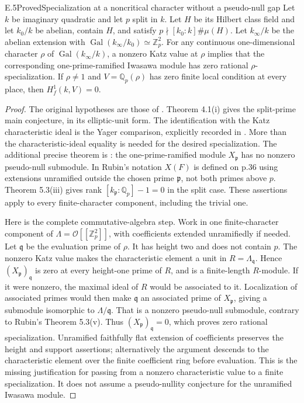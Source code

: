 \begin{statement}{E.5}{Proved}{Specialization at a noncritical character without a pseudo-null gap}
Let \(k\) be imaginary quadratic and let \(p\) split in \(k\).
Let \(H\) be its Hilbert class field and let \(k_0/k\) be
abelian, contain \(H\), and satisfy
\(p\nmid[k_0:k]\#\mu(H)\). Let \(k_\infty/k\) be the
abelian extension with
\(\operatorname{Gal}(k_\infty/k_0)\simeq\mathbb Z_p^2\).
For any continuous one-dimensional character \(\rho\)
of \(\operatorname{Gal}(k_\infty/k)\), a nonzero Katz value
at \(\rho\) implies that the corresponding one-prime-ramified
Iwasawa module has zero rational \(\rho\)-specialization.
If \(\rho\ne1\) and \(V=\mathbb Q_p(\rho)\) has zero
finite local condition at every place, then
\(H_f^1(k,V)=0\).
\end{statement}
\begin{proof}
The original hypotheses are those of
\cite[\S4, pp.36--37]{DE_Rubin1991}. Theorem 4.1(i) gives
the split-prime main conjecture, in its elliptic-unit
form. The identification with the Katz characteristic
ideal is the Yager comparison, explicitly recorded in
\cite[Theorem 3.3.1]{DE_BCGKPST}. More than the
characteristic-ideal equality is needed for the desired
specialization. The additional precise theorem is
\cite[Theorem 5.3(v), pp.40--41]{DE_Rubin1991}:
the one-prime-ramified module \(X_{\mathfrak p}\) has no
nonzero pseudo-null submodule. In Rubin's notation
\(X(F)\) is defined on p.36 using extensions unramified
outside the chosen prime \(\mathfrak p\), not both
primes above \(p\). Theorem 5.3(iii) gives rank
\([k_{\mathfrak p}:\mathbb Q_p]-1=0\) in the split case.
These assertions apply to every finite-character
component, including the trivial one.

Here is the complete commutative-algebra step. Work in
one finite-character component of
\(\Lambda=\mathcal O[[\mathbb Z_p^2]]\), with coefficients
extended unramifiedly if needed. Let \(\mathfrak q\) be
the evaluation prime of \(\rho\). It has height two
and does not contain \(p\). The nonzero Katz value
makes the characteristic element a unit in
\(R=\Lambda_{\mathfrak q}\). Hence
\((X_{\mathfrak p})_{\mathfrak q}\) is zero at every
height-one prime of \(R\), and is a finite-length
\(R\)-module. If it were nonzero, the maximal ideal
of \(R\) would be associated to it. Localization of
associated primes would then make \(\mathfrak q\)
an associated prime of \(X_{\mathfrak p}\), giving
a submodule isomorphic to \(\Lambda/\mathfrak q\).
That is a nonzero pseudo-null submodule, contrary to
Rubin's Theorem 5.3(v). Thus
\((X_{\mathfrak p})_{\mathfrak q}=0\), which proves
zero rational specialization. Unramified faithfully
flat extension of coefficients preserves the
height and support assertions; alternatively the
argument descends to the characteristic element
over the finite coefficient ring before evaluation.
This is the missing justification for passing from
a nonzero characteristic value to a finite
specialization. It does not assume a pseudo-nullity
conjecture for the unramified Iwasawa module.


\end{proof}
